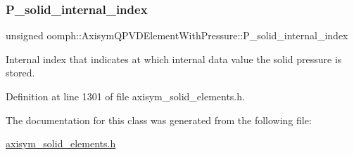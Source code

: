 \subsubsection{\texorpdfstring{P\+\_\+solid\+\_\+internal\+\_\+index}{P\_solid\_internal\_index}}
{\footnotesize\ttfamily unsigned oomph\+::\+Axisym\+Q\+P\+V\+D\+Element\+With\+Pressure\+::\+P\+\_\+solid\+\_\+internal\+\_\+index\hspace{0.3cm}{\ttfamily [private]}}



Internal index that indicates at which internal data value the solid pressure is stored. 



Definition at line 1301 of file axisym\+\_\+solid\+\_\+elements.\+h.



The documentation for this class was generated from the following file\+:\begin{DoxyCompactItemize}
\item 
\hyperlink{axisym__solid__elements_8h}{axisym\+\_\+solid\+\_\+elements.\+h}\end{DoxyCompactItemize}
